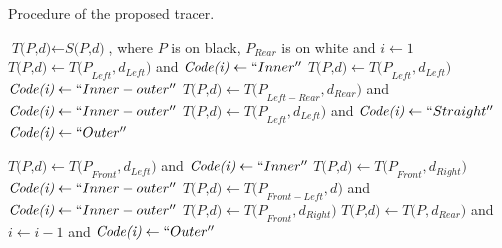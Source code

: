 \documentclass[sensors,article,accept,moreauthors,pdftex,10pt,a4paper]{mdpi}
\begin{document}
\begin{algorithm}[H]
	\caption{Procedure of the proposed tracer.}
	\label{alg:proposed}
	\begin{algorithmic}[1]
	\begin{spacing}{1.5}%
	\State $\textit{T(P,d)} \gets \textit{S(P,d)}$, where $P$ is on black, $P_{Rear}$ is on white and $i \gets 1$
	\Do
			\State $\textit{T(P,d)} \gets \textit{T(P}_{Left},\textit{d}_{Left} ) $ and $\textit{Code(i)} \gets ``Inner''$
			\State $\textit{T(P,d)} \gets \textit{T(P}_{Left}, \textit{d}_{Left})$
		\Else
			\State $\textit{Code(i)} \gets ``Inner-outer''$
			\State $\textit{T(P,d)} \gets \textit{T(P}_{Left-Rear},\textit{d}_{Rear} ) $ and $\textit{Code(i)} \gets ``Inner-outer''$
		\EndIf
	\Else
			\State $\textit{T(P,d)} \gets \textit{T(P}_{Left},\textit{d}_{Left} ) $ and $\textit{Code(i)} \gets ``Straight''$
		\Else
			\State $\textit{Code(i)} \gets ``Outer''$ \vspace{6pt}
		\EndIf
	\EndIf


			\State $\textit{T(P,d)} \gets \textit{T(P}_{Front},\textit{d}_{Left} ) $ and $\textit{Code(i)} \gets ``Inner''$
			\State $\textit{T(P,d)} \gets \textit{T(P}_{Front}, \textit{d}_{Right})$
		\Else
			\State $\textit{Code(i)} \gets ``Inner-outer''$
			\State $\textit{T(P,d)} \gets \textit{T(P}_{Front-Left},\textit{d} ) $ and $\textit{Code(i)} \gets ``Inner-outer''$
		\EndIf
		\State $\textit{T(P,d)} \gets \textit{T(P}_{Front},\textit{d}_{Right} ) $
	\Else
		\State $\textit{T(P,d)} \gets \textit{T(P},\textit{d}_{Rear} ) $ and $i \gets i-1$ and $\textit{Code(i)} \gets ``Outer''$
	\EndIf


	\EndProcedure
	\end{spacing} \vspace{-6pt}
	\end{algorithmic}
\end{algorithm}
\end{document}
